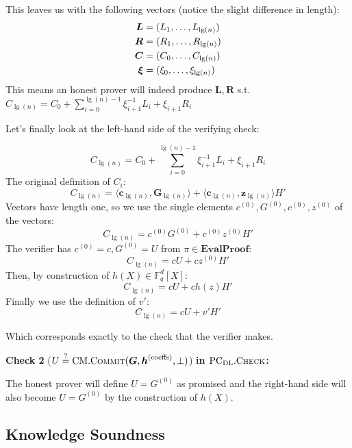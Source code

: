 \documentclass[
]{article}
\newcommand*\Fb{\mathbb{F}}
\newcommand*\meq{\stackrel{?}{=}}
\renewcommand{\vec}[1]{ \boldsymbol{#1} }
\newcommand{\ip}[2]{ \langle #1, #2 \rangle }
\newcommand*{\Commit}{\mathrm{\text{C{\scriptsize OMMIT}}}}
\newcommand*{\PCDL}{\text{PC}_{\text{DL}}}
\newcommand*{\PCDLCheck}{\PCDL.\mathrm{\text{C\scriptsize HECK}}}
\newcommand*{\CM}{\mathrm{\text{CM}}}
\newcommand*{\CMCommit}{\CM.\Commit}
\newcommand*\EvalProof{\mathbf{EvalProof}}
\begin{document}
This leaves us with the following vectors (notice the slight difference
in length): \[
\begin{alignedat}[b]{1}
  \vec{L}    &= (L_1, \dots, L_{\lg(n)}) \\
  \vec{R}    &= (R_1, \dots, R_{\lg(n)}) \\
  \vec{C}    &= (C_0, \dots, C_{\lg(n)}) \\
  \vec{\xi}  &= (\xi_0, \dots, \xi_{\lg(n)}) \\
\end{alignedat}
\] This means an honest prover will indeed produce \(\vec{L}, \vec{R}\)
s.t.
\(C_{\lg(n)} = C_0 + \sum^{\lg(n)-1}_{i=0} \xi^{-1}_{i+1} L_i + \xi_{i+1}
R_i\)

Let's finally look at the left-hand side of the verifying check:

\[C_{\lg(n)} = C_0 + \sum^{\lg(n)-1}_{i=0} \xi^{-1}_{i+1} L_i + \xi_{i+1} R_i\]
The original definition of \(C_i\):
\[C_{\lg(n)} = \ip{\vec{c}_{\lg(n)}}{\vec{G}_{\lg(n)}} + \ip{\vec{c}_{\lg(n)}}{\vec{z}_{\lg(n)}} H'\]
Vectors have length one, so we use the single elements
\(c^{(0)}, G^{(0)}, c^{(0)}, z^{(0)}\) of the vectors:
\[C_{\lg(n)} = c^{(0)}G^{(0)} + c^{(0)}z^{(0)} H'\] The verifier has
\(c^{(0)} = c, G^{(0)} = U\) from \(\pi \in \EvalProof\):
\[C_{\lg(n)} = cU + cz^{(0)} H'\] Then, by construction of
\(h(X) \in \Fb^d_q[X]\): \[C_{\lg(n)} = cU + ch(z) H'\] Finally we use
the definition of \(v'\): \[C_{\lg(n)} = cU + v'H'\]

Which corresponds exactly to the check that the verifier makes.

\textbf{Check 2}
(\(U \meq \CMCommit(\vec{G}, \vec{h}^{\text{(coeffs)}}, \bot)\))
\textbf{in \(\PCDLCheck\):}

The honest prover will define \(U = G^{(0)}\) as promised and the
right-hand side will also become \(U = G^{(0)}\) by the construction of
\(h(X)\).

\subsection{Knowledge Soundness}\label{knowledge-soundness}
\end{document}
